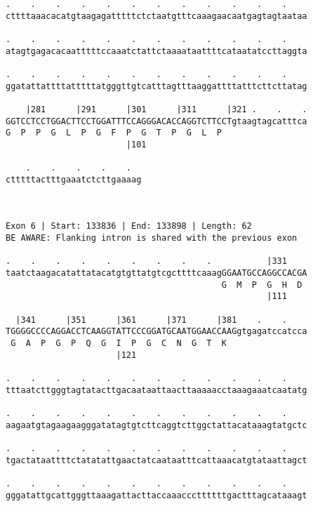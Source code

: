 \documentclass{article}
\begin{document}
\begin{Verbatim}
.    .    .    .    .    .    .    .    .    .    .    .    
cttttaaacacatgtaagagatttttctctaatgtttcaaagaacaatgagtagtaataa
                                                            
.    .    .    .    .    .    .    .    .    .    .    .    
atagtgagacacaatttttccaaatctattctaaaataattttcataatatccttaggta
                                                            
.    .    .    .    .    .    .    .    .    .    .    .    
ggatattattttatttttatgggttgtcatttagtttaaggattttatttcttcttatag
                                                            
    |281      |291      |301      |311      |321 .    .    .
GGTCCTCCTGGACTTCCTGGATTTCCAGGGACACCAGGTCTTCCTgtaagtagcatttca
G  P  P  G  L  P  G  F  P  G  T  P  G  L  P                 
                        |101                                
  
    .    .    .    .    .  
ctttttactttgaaatctcttgaaaag
                           
                           
 
Exon 6 | Start: 133836 | End: 133898 | Length: 62
BE AWARE: Flanking intron is shared with the previous exon
 
.    .    .    .    .    .    .    .    .           |331    
taatctaagacatattatacatgtgttatgtcgcttttcaaagGGAATGCCAGGCCACGA
                                           G  M  P  G  H  D 
                                                    |111    
  
  |341      |351      |361      |371      |381    .    .    
TGGGGCCCCAGGACCTCAAGGTATTCCCGGATGCAATGGAACCAAGgtgagatccatcca
 G  A  P  G  P  Q  G  I  P  G  C  N  G  T  K                
                      |121                                  
  
.    .    .    .    .    .    .    .    .    .    .    .    
tttaatcttgggtagtatacttgacaataattaacttaaaaacctaaagaaatcaatatg
                                                            
.    .    .    .    .    .    .    .    .    .    .    .    
aagaatgtagaagaagggatatagtgtcttcaggtcttggctattacataaagtatgctc
                                                            
.    .    .    .    .    .    .    .    .    .    .    .    
tgactataattttctatatattgaactatcaataatttcattaaacatgtataattagct
                                                            
.    .    .    .    .    .    .    .    .    .    .    .    
gggatattgcattgggttaaagattacttaccaaacccttttttgactttagcataaagt
                                                            

\end{Verbatim}
\end{document}
